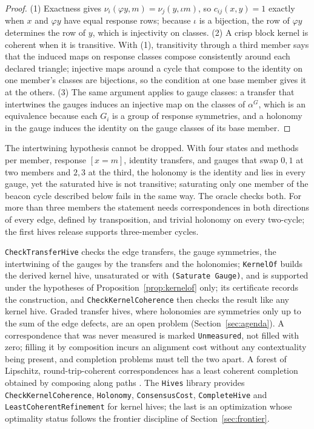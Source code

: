 \documentclass[11pt]{article}
\newcommand{\code}[1]{\texttt{#1}}
\theoremstyle{definition}
\theoremstyle{plain}
\begin{document}
\begin{proof}
(1) Exactness gives $\nu_i(\varphi y,m)=\nu_j(y,\iota m)$, so $c_{ij}(x,y)=1$ exactly when $x$ and
$\varphi y$ have equal response rows; because $\iota$ is a bijection, the row of $\varphi y$
determines the row of $y$, which is injectivity on classes. (2) A crisp block kernel is coherent
when it is transitive. With (1), transitivity through a third member says that the induced maps on
response classes compose consistently around each declared triangle; injective maps around a
cycle that compose to the identity on one member's classes are bijections, so the condition at one
base member gives it at the others. (3) The same argument applies to gauge classes: a transfer that
intertwines the gauges induces an injective map on the classes of $\alpha^G$, which is an
equivalence because each $G_i$ is a group of response symmetries, and a holonomy in the gauge
induces the identity on the gauge classes of its base member.
\end{proof}

The intertwining hypothesis cannot be dropped. With four states and methods per member, response
$[x=m]$, identity transfers, and gauges that swap $0,1$ at two members and $2,3$ at the third,
the holonomy is the identity and lies in every gauge, yet the saturated hive is not transitive;
saturating only one member of the beacon cycle described below fails in the same way. The oracle
checks both. For more than three members the statement needs correspondences in both directions
of every edge, defined by transposition, and trivial holonomy on every two-cycle; the first hives
release supports three-member cycles.

\code{CheckTransferHive} checks the edge transfers, the gauge symmetries, the intertwining of the
gauges by the transfers and the holonomies;
\code{KernelOf} builds the derived kernel hive, unsaturated or with \code{(Saturate Gauge)}, and is
supported under the hypotheses of Proposition~\ref{prop:kernelof} only; its certificate records the
construction, and \code{CheckKernelCoherence} then checks the result like any kernel hive. Graded transfer hives, where holonomies are symmetries only up
to the sum of the edge defects, are an open problem (Section~\ref{sec:agenda}). A correspondence
that was never measured is marked \code{Unmeasured}, not filled with zero; filling it by composition
incurs an alignment cost without any contextuality being present, and completion problems must tell
the two apart. A forest of Lipschitz, round-trip-coherent correspondences has a least coherent
completion obtained by composing along paths \cite[Proposition~9.3]{dclosure}. The \code{Hives}
library provides \code{CheckKernelCoherence}, \code{Holonomy}, \code{ConsensusCost},
\code{CompleteHive} and \code{LeastCoherentRefinement} for kernel hives; the last is an optimization
whose optimality status follows the frontier discipline of Section~\ref{sec:frontier}.
\end{document}
